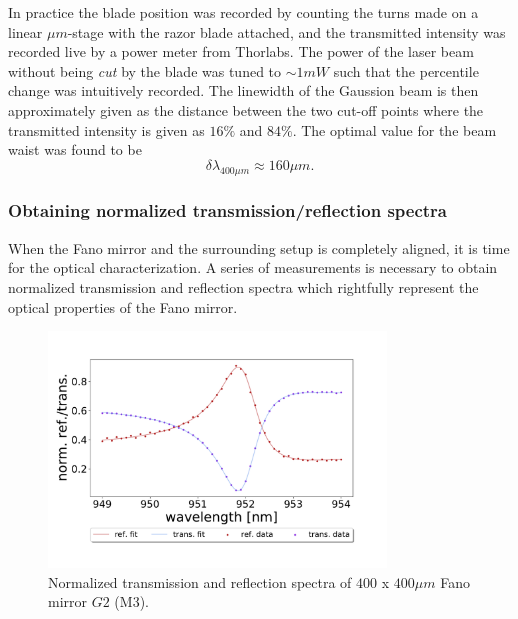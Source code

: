 In practice the blade position was recorded by counting the turns made on a linear $\mu m$-stage with the razor blade attached, and the transmitted intensity was recorded live by a power meter from Thorlabs. The power of the laser beam without being \emph{cut} by the blade was tuned to $\sim 1 mW$ such that the percentile change was intuitively recorded. The linewidth of the Gaussion beam is then approximately given as the distance between the two cut-off points where the transmitted intensity is given as $16\%$ and $84\%$. The optimal value for the beam waist was found to be
\begin{equation}
    \delta \lambda_{400 \mu m} \approx 160 \mu m.
\end{equation}

\subsubsection{Obtaining normalized transmission/reflection spectra}

When the Fano mirror and the surrounding setup is completely aligned, it is time for the optical characterization. A series of measurements is necessary to obtain normalized transmission and reflection spectra which rightfully represent the optical properties of the Fano mirror. 

\begin{figure}[h!]
    \centering
    \includegraphics[width=0.8\textwidth]{figures/norm_ref_and_trans_M3.pdf}
    \caption{Normalized transmission and reflection spectra of $400$ x $400 \mu m$ Fano mirror $G2$ (M3).}
    \label{fig:normalized_ref_trans_spectra}
\end{figure}

